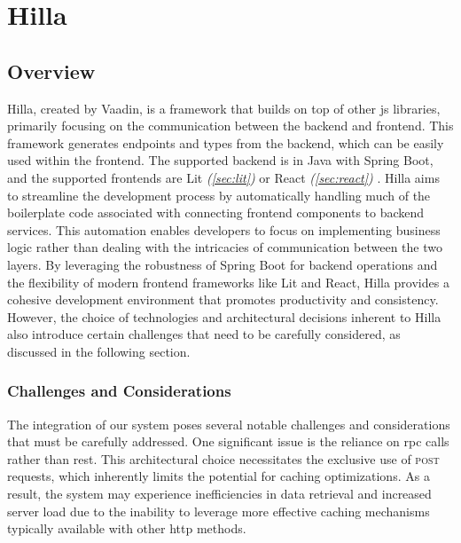\section{Hilla}
\label{sec:hilla}

\subsection{Overview}
\label{subsec:hilla:overview}

Hilla, created by Vaadin, is a \gls{framework} that builds on top of other \acrshort{js} libraries, primarily focusing on the communication between the backend and frontend. This \gls{framework} generates endpoints and types from the backend, which can be easily used within the frontend. The supported backend is in Java with Spring Boot, and the supported frontends are Lit \textit{(\ref{sec:lit})} \cite{hilla:lit} or React \textit{(\ref{sec:react})} \cite{hilla:react}. Hilla aims to streamline the development process by automatically handling much of the boilerplate code associated with connecting frontend components to backend services. This automation enables developers to focus on implementing business logic rather than dealing with the intricacies of communication between the two layers. By leveraging the robustness of Spring Boot for backend operations and the flexibility of modern frontend frameworks like Lit and React, Hilla provides a cohesive development environment that promotes productivity and consistency. However, the choice of technologies and architectural decisions inherent to Hilla also introduce certain challenges that need to be carefully considered, as discussed in the following section.

\subsubsection{Challenges and Considerations}
\label{subsec:hilla:challenges}

The integration of our system poses several notable challenges and considerations that must be carefully addressed. One significant issue is the reliance on \acrshort{rpc} calls rather than \acrshort{rest}. This architectural choice necessitates the exclusive use of \textsc{post} requests, which inherently limits the potential for caching optimizations. As a result, the system may experience inefficiencies in data retrieval and increased server load due to the inability to leverage more effective caching mechanisms typically available with other \acrshort{http} methods. \cite{restfulapi:caching,stackoverflow:chrome_cache}

